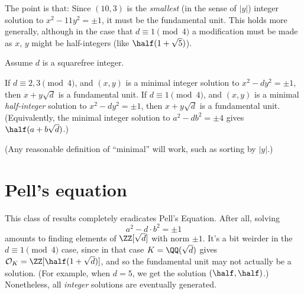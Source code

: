 The point is that: Since $(10,3)$ is the \emph{smallest}
(in the sense of $\left\lvert y \right\rvert$)
integer solution to $x^2-11y^2 = \pm 1$, it must be the fundamental unit.
This holds more generally, although in the case that $d \equiv 1 \pmod 4$
a modification must be made as $x$, $y$ might be half-integers (like $\half(1+\sqrt5)$).
\begin{theorem}
	Assume $d$ is a squarefree integer.
	\begin{enumerate}[(a)]
		\ii If $d \equiv 2,3 \pmod 4$,
		and $(x,y)$ is a minimal integer solution to $x^2-dy^2 = \pm 1$,
		then $x + y \sqrt d$ is a fundamental unit.
		\ii If $d \equiv 1 \pmod 4$,
		and $(x,y)$ is a minimal \emph{half-integer} solution to $x^2-dy^2 = \pm 1$,
		then $x + y \sqrt d$ is a fundamental unit.
		(Equivalently, the minimal integer solution to $a^2 - db^2 = \pm 4$
		gives $\half (a + b \sqrt d)$.)
	\end{enumerate}
	(Any reasonable definition of ``minimal'' will work, such as sorting by $\left\lvert y \right\rvert$.)
\end{theorem}

\section{Pell's equation}
This class of results completely eradicates Pell's Equation.
After all, solving
\[ a^2 - d \cdot b^2 = \pm 1 \]
amounts to finding elements of $\ZZ[\sqrt d]$ with norm $\pm 1$.
It's a bit weirder in the $d \equiv 1 \pmod 4$ case, since in that case $K = \QQ(\sqrt d)$
gives $\OO_K = \ZZ[\half(1+\sqrt d)]$, and so the fundamental unit may not actually be a solution.
(For example, when $d = 5$, we get the solution $(\half, \half)$.)
Nonetheless, all \emph{integer} solutions are eventually generated.

